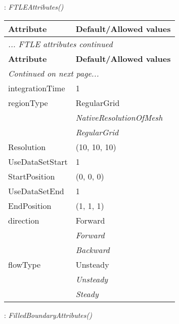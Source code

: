 \documentclass[10pt,a4paper]{report}
\begin{document}
\newpage

{}
: {\it FTLEAttributes() }\\[-3mm]

\begin{longtable}{ll}
{\bf Attribute} & {\bf Default/Allowed values} \\
\hline \hline
\endfirsthead
\multicolumn{2}{l}{{\it ... FTLE attributes continued}} \\
{\bf Attribute} & {\bf Default/Allowed values} \\
\hline \hline
\endhead
\hline
\multicolumn{2}{l}{{\it Continued on next page...}} \\
\endfoot
\hline
\endlastfoot

integrationTime  &  1 \\
regionType  &  RegularGrid   \\
 & {\it  NativeResolutionOfMesh} \\
 & {\it  RegularGrid} \\
Resolution  &  (10, 10, 10) \\
UseDataSetStart  &  1 \\
StartPosition  &  (0, 0, 0) \\
UseDataSetEnd  &  1 \\
EndPosition  &  (1, 1, 1) \\
direction  &  Forward   \\
 & {\it  Forward} \\
 & {\it  Backward} \\
flowType  &  Unsteady   \\
 & {\it  Unsteady} \\
 & {\it  Steady} \\
\end{longtable}

\newpage

{}
: {\it FilledBoundaryAttributes() }\\[-3mm]
\end{document}
